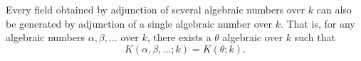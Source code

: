 Every field obtained by adjunction of several algebraic numbers over $k$ can also be generated by adjunction of a single algebraic number over $k$. That is, for any algebraic numbers $\alpha, \beta, \ldots$ over $k$, there exists a $\theta$ algebraic over $k$ such that
$$K(\alpha, \beta, \ldots; k) = K(\theta; k).$$
